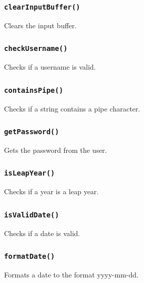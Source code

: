 \documentclass[12pt,a4paper]{report}
\begin{document}
\subsubsection{\texttt{clearInputBuffer()}}
Clears the input buffer.


\subsubsection{\texttt{checkUsername()}}
Checks if a username is valid.


\subsubsection{\texttt{containsPipe()}}
Checks if a string contains a pipe character.


\subsubsection{\texttt{getPassword()}}
Gets the password from the user.


\subsubsection{\texttt{isLeapYear()}}
Checks if a year is a leap year.


\subsubsection{\texttt{isValidDate()}}
Checks if a date is valid.


\subsubsection{\texttt{formatDate()}}
Formats a date to the format yyyy-mm-dd.

\end{document}
